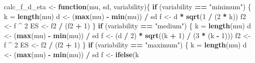 \documentclass[
]{book}
\newenvironment{Shaded}{\begin{snugshade}}{\end{snugshade}}
\newcommand{\ControlFlowTok}[1]{\textcolor[rgb]{0.13,0.29,0.53}{\textbf{#1}}}
\newcommand{\DecValTok}[1]{\textcolor[rgb]{0.00,0.00,0.81}{#1}}
\newcommand{\FloatTok}[1]{\textcolor[rgb]{0.00,0.00,0.81}{#1}}
\newcommand{\KeywordTok}[1]{\textcolor[rgb]{0.13,0.29,0.53}{\textbf{#1}}}
\newcommand{\NormalTok}[1]{#1}
\newcommand{\OperatorTok}[1]{\textcolor[rgb]{0.81,0.36,0.00}{\textbf{#1}}}
\newcommand{\StringTok}[1]{\textcolor[rgb]{0.31,0.60,0.02}{#1}}
\begin{document}
\begin{Shaded}
\begin{Highlighting}[]
\NormalTok{calc_f_d_eta <-}\StringTok{ }\ControlFlowTok{function}\NormalTok{(mu, sd, variability)\{}
  \ControlFlowTok{if}\NormalTok{ (variability }\OperatorTok{==}\StringTok{ "minimum"}\NormalTok{) \{}
\NormalTok{    k =}\StringTok{ }\KeywordTok{length}\NormalTok{(mu)}
\NormalTok{    d <-}\StringTok{ }\NormalTok{(}\KeywordTok{max}\NormalTok{(mu) }\OperatorTok{-}\StringTok{ }\KeywordTok{min}\NormalTok{(mu)) }\OperatorTok{/}\StringTok{ }\NormalTok{sd}
\NormalTok{    f <-}\StringTok{ }\NormalTok{d }\OperatorTok{*}\StringTok{ }\KeywordTok{sqrt}\NormalTok{(}\DecValTok{1} \OperatorTok{/}\StringTok{ }\NormalTok{(}\DecValTok{2} \OperatorTok{*}\StringTok{ }\NormalTok{k))}
\NormalTok{    f2 <-}\StringTok{ }\NormalTok{f }\OperatorTok{^}\StringTok{ }\DecValTok{2}
\NormalTok{    ES <-}\StringTok{ }\NormalTok{f2 }\OperatorTok{/}\StringTok{ }\NormalTok{(f2 }\OperatorTok{+}\StringTok{ }\DecValTok{1}\NormalTok{)}
\NormalTok{  \}}
  \ControlFlowTok{if}\NormalTok{ (variability }\OperatorTok{==}\StringTok{ "medium"}\NormalTok{) \{}
\NormalTok{    k =}\StringTok{ }\KeywordTok{length}\NormalTok{(mu)}
\NormalTok{    d <-}\StringTok{ }\NormalTok{(}\KeywordTok{max}\NormalTok{(mu) }\OperatorTok{-}\StringTok{ }\KeywordTok{min}\NormalTok{(mu)) }\OperatorTok{/}\StringTok{ }\NormalTok{sd}
\NormalTok{    f <-}\StringTok{ }\NormalTok{(d }\OperatorTok{/}\StringTok{ }\DecValTok{2}\NormalTok{) }\OperatorTok{*}\StringTok{ }\KeywordTok{sqrt}\NormalTok{((k }\OperatorTok{+}\StringTok{ }\DecValTok{1}\NormalTok{) }\OperatorTok{/}\StringTok{ }\NormalTok{(}\DecValTok{3} \OperatorTok{*}\StringTok{ }\NormalTok{(k }\OperatorTok{-}\StringTok{ }\DecValTok{1}\NormalTok{)))}
\NormalTok{    f2 <-}\StringTok{ }\NormalTok{f }\OperatorTok{^}\StringTok{ }\DecValTok{2}
\NormalTok{    ES <-}\StringTok{ }\NormalTok{f2 }\OperatorTok{/}\StringTok{ }\NormalTok{(f2 }\OperatorTok{+}\StringTok{ }\DecValTok{1}\NormalTok{)}
\NormalTok{  \}}
  \ControlFlowTok{if}\NormalTok{ (variability }\OperatorTok{==}\StringTok{ "maximum"}\NormalTok{) \{}
\NormalTok{    k =}\StringTok{ }\KeywordTok{length}\NormalTok{(mu)}
\NormalTok{    d <-}\StringTok{ }\NormalTok{(}\KeywordTok{max}\NormalTok{(mu) }\OperatorTok{-}\StringTok{ }\KeywordTok{min}\NormalTok{(mu)) }\OperatorTok{/}\StringTok{ }\NormalTok{sd}
\NormalTok{    f <-}\StringTok{ }\KeywordTok{ifelse}\NormalTok{(k }\OperatorTok{%
}
\end{Highlighting}
\end{Shaded}
\end{document}
